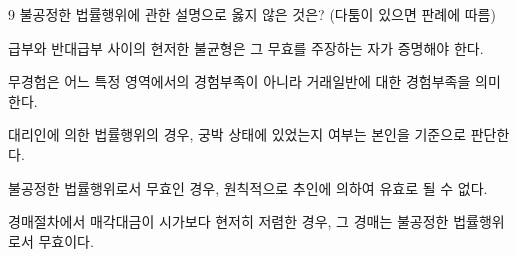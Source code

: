\begin{question}{9}
불공정한 법률행위에 관한 설명으로 옳지 않은 것은? (다툼이 있으면 판례에 따름)
\begin{choices}
  \item 급부와 반대급부 사이의 현저한 불균형은 그 무효를 주장하는 자가 증명해야 한다.
  \item 무경험은 어느 특정 영역에서의 경험부족이 아니라 거래일반에 대한 경험부족을 의미한다.
  \item 대리인에 의한 법률행위의 경우, 궁박 상태에 있었는지 여부는 본인을 기준으로 판단한다.
  \item 불공정한 법률행위로서 무효인 경우, 원칙적으로 추인에 의하여 유효로 될 수 없다.
  \item 경매절차에서 매각대금이 시가보다 현저히 저렴한 경우, 그 경매는 불공정한 법률행위로서 무효이다.
\end{choices}
\end{question}
